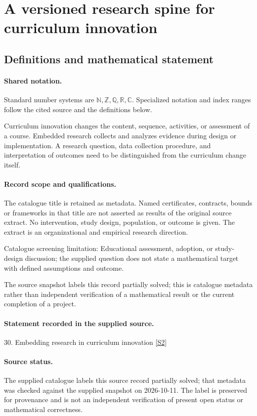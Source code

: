 \documentclass[11pt]{article}
\newcommand{\sref}[2]{\hyperlink{source:#1:#2}{[S#2]}}
\begin{document}
\section{A versioned research spine for curriculum innovation}\label{statement}

\subsection{Definitions and mathematical statement}

\paragraph{Shared notation.}Standard number systems are $\mathbb N,\mathbb Z,\mathbb Q,\mathbb R,\mathbb C$. Specialized notation and index ranges follow the cited source and the definitions below.


Curriculum innovation changes the content, sequence, activities, or assessment of a course. Embedded research collects and analyzes evidence during design or implementation. A research question, data collection procedure, and interpretation of outcomes need to be distinguished from the curriculum change itself.
\paragraph{Record scope and qualifications.}
The catalogue title is retained as metadata. Named certificates, contracts, bounds or frameworks in that title are not asserted as results of the original source extract.
No intervention, study design, population, or outcome is given. The extract is an organizational and empirical research direction.

Catalogue screening limitation: Educational assessment, adoption, or study-design discussion; the supplied question does not state a mathematical target with defined assumptions and outcome.

The source snapshot labels this record partially solved; this is catalogue metadata rather than independent verification of a mathematical result or the current completion of a project.
\paragraph{Statement recorded in the supplied source.}
30. Embedding research in curriculum innovation \sref{statement}{2}
\paragraph{Source status.}
The supplied catalogue labels this source record partially solved; that metadata was checked against the supplied snapshot on 2026-10-11. The label is preserved for provenance and is not an independent verification of present open status or mathematical correctness.
\end{document}
